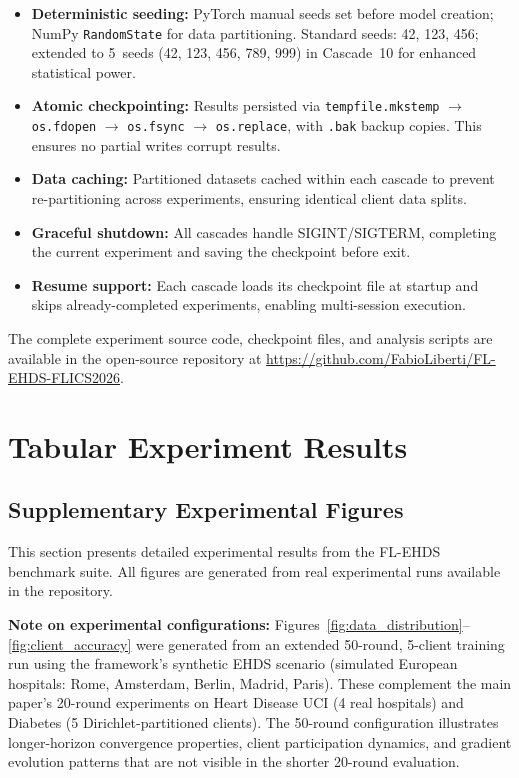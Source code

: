 \documentclass[conference]{IEEEtran}
\begin{document}
\begin{itemize}
    \item \textbf{Deterministic seeding:} PyTorch manual seeds set before model creation; NumPy \texttt{RandomState} for data partitioning. Standard seeds: 42, 123, 456; extended to 5~seeds (42, 123, 456, 789, 999) in Cascade~10 for enhanced statistical power.
    \item \textbf{Atomic checkpointing:} Results persisted via \texttt{tempfile.mkstemp} $\to$ \texttt{os.fdopen} $\to$ \texttt{os.fsync} $\to$ \texttt{os.replace}, with \texttt{.bak} backup copies. This ensures no partial writes corrupt results.
    \item \textbf{Data caching:} Partitioned datasets cached within each cascade to prevent re-partitioning across experiments, ensuring identical client data splits.
    \item \textbf{Graceful shutdown:} All cascades handle SIGINT/SIGTERM, completing the current experiment and saving the checkpoint before exit.
    \item \textbf{Resume support:} Each cascade loads its checkpoint file at startup and skips already-completed experiments, enabling multi-session execution.
\end{itemize}

\noindent The complete experiment source code, checkpoint files, and analysis scripts are available in the open-source repository at \url{https://github.com/FabioLiberti/FL-EHDS-FLICS2026}.


\section{Tabular Experiment Results}
\label{app:tabular_results}

\subsection{Supplementary Experimental Figures}
\label{sec:figures}

This section presents detailed experimental results from the FL-EHDS benchmark suite. All figures are generated from real experimental runs available in the repository.

\textbf{Note on experimental configurations:} Figures~\ref{fig:data_distribution}--\ref{fig:client_accuracy} were generated from an extended 50-round, 5-client training run using the framework's synthetic EHDS scenario (simulated European hospitals: Rome, Amsterdam, Berlin, Madrid, Paris). These complement the main paper's 20-round experiments on Heart Disease UCI (4 real hospitals) and Diabetes (5 Dirichlet-partitioned clients). The 50-round configuration illustrates longer-horizon convergence properties, client participation dynamics, and gradient evolution patterns that are not visible in the shorter 20-round evaluation.
\end{document}
